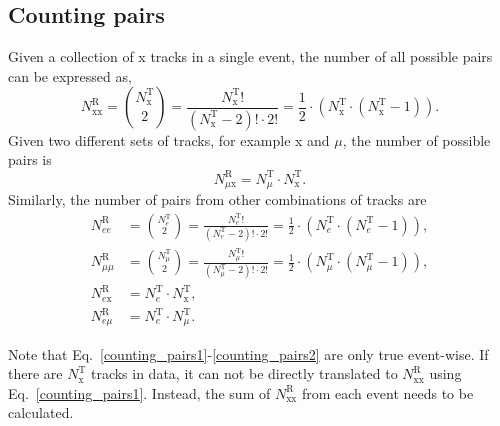 \subsection{Counting pairs}
Given a collection of x tracks in a single event, the number of all possible pairs can be expressed as,
\begin{equation}
\label{counting_pairs1}
N^{\mathrm{R}}_{\mathrm{xx}} = \binom{N^{\mathrm{T}}_{\mathrm{x}}}{2} = \frac{N^{\mathrm{T}}_{\mathrm{x}}!}{(N^{\mathrm{T}}_{\mathrm{x}}-2)!\cdot 2!} = \frac{1}{2} \cdot (N^{\mathrm{T}}_{\mathrm{x}}\cdot(N^{\mathrm{T}}_{\mathrm{x}}-1)).
\end{equation}
%
Given two different sets of tracks, for example x and $\mu$, the number of possible pairs is
\begin{equation}
N^{\mathrm{R}}_{\mu \mathrm{x}} = N^{\mathrm{T}}_{\mu} \cdot N^{\mathrm{T}}_{\mathrm{x}}.
\end{equation}
%
Similarly, the number of pairs from other combinations of tracks are
\begin{align}
\label{counting_pairs2}
N^{\mathrm{R}}_{ee} &= \binom{N^{\mathrm{T}}_{e}}{2} = \frac{N^{\mathrm{T}}_{e}!}{(N^{\mathrm{T}}_{e}-2)!\cdot 2!} = \frac{1}{2} \cdot (N^{\mathrm{T}}_{e}\cdot(N^{\mathrm{T}}_{e}-1)), \nonumber\\
N^{\mathrm{R}}_{\mu\mu} &= \binom{N^{\mathrm{T}}_{\mu}}{2} = \frac{N^{\mathrm{T}}_{\mu}!}{(N^{\mathrm{T}}_{\mu}-2)!\cdot 2!} = \frac{1}{2} \cdot (N^{\mathrm{T}}_{\mu}\cdot(N^{\mathrm{T}}_{\mu}-1)), \nonumber\\
N^{\mathrm{R}}_{e\mathrm{x}} &= N^{\mathrm{T}}_{e} \cdot N^{\mathrm{T}}_{\mathrm{x}},\nonumber \\
N^{\mathrm{R}}_{e \mu} &= N^{\mathrm{T}}_{e} \cdot N^{\mathrm{T}}_{\mu}.
\end{align}

Note that Eq.~\ref{counting_pairs1}-\ref{counting_pairs2} are only true event-wise. If there are $N^{\mathrm{T}}_{\mathrm{x}}$ tracks in data, it can not be directly translated to $N^{\mathrm{R}}_{\mathrm{xx}}$ using Eq.~\ref{counting_pairs1}. Instead, the sum of $N^{\mathrm{R}}_{\mathrm{xx}}$ from each event needs to be calculated.



